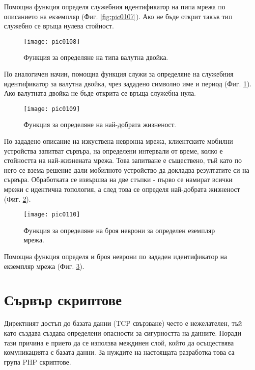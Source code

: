 Помощна функция определя служебния идентификатор на пипа мрежа по описанието на екземпляр (Фиг. \ref{fig:pic0107}). Ако не бъде открит такъв тип служебно се връща нулева стойност. 

\begin{figure}[h]
  \centering
  \texttt{[image: pic0108]}
  \caption{Функция за определяне на типа валутна двойка.}
\label{fig:pic0108}
\end{figure}
\FloatBarrier

По аналогичен начин, помощна функция служи за определяне на служебния идентификатор за валутна двойка, чрез зададено символно име и период (Фиг. \ref{fig:pic0108}). Ако валутната двойка не бъде открита се връща служебна нула. 

\begin{figure}[h]
  \centering
  \texttt{[image: pic0109]}
  \caption{Функция за определяне на най-добрата жизненост.}
\label{fig:pic0109}
\end{figure}
\FloatBarrier

По зададено описание на изкуствена невронна мрежа, клиентските мобилни устройства запитват сървъра, на определени интервали от време, колко е стойността на най-жизнената мрежа. Това запитване е съществено, тъй като по него се взема решение дали мобилното устройство да докладва резултатите си на сървъра. Обработката се извършва на две стъпки - първо се намират всички мрежи с идентична топология, а след това се определя най-добрата жизненост (Фиг. \ref{fig:pic0109}).

\begin{figure}[h]
  \centering
  \texttt{[image: pic0110]}
  \caption{Функция за определяне на броя неврони за определен еземпляр мрежа.}
\label{fig:pic0110}
\end{figure}
\FloatBarrier

Помощна функция определя и броя неврони по зададен идентификатор на екземпляр мрежа (Фиг. \ref{fig:pic0110}).

\section{Сървър скриптове}

Директният достъп до базата данни (TCP свързване) често е нежелателен, тъй като създава създава определени опасности за сигурността на данните. Поради тази причина е прието да се използва междинен слой, който да осъществява комуникацията с базата данни. За нуждите на настоящата разработка това са група PHP скриптове. 

